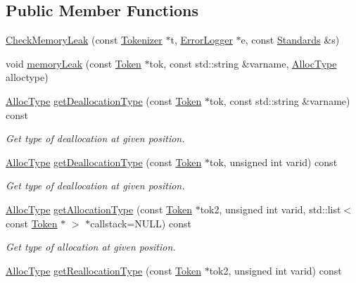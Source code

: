 \subsection*{Public Member Functions}
\begin{DoxyCompactItemize}
\item 
\hyperlink{class_check_memory_leak_a467ffa1c6f2af4bf3716676822a6de6b}{Check\-Memory\-Leak} (const \hyperlink{class_tokenizer}{Tokenizer} $\ast$t, \hyperlink{class_error_logger}{Error\-Logger} $\ast$e, const \hyperlink{struct_standards}{Standards} \&s)
\item 
void \hyperlink{class_check_memory_leak_ab4732d28de9c3966fc375eed62c8591c}{memory\-Leak} (const \hyperlink{class_token}{Token} $\ast$tok, const std\-::string \&varname, \hyperlink{class_check_memory_leak_ada9e7f7d0af2d8ba771a42d427f51ede}{Alloc\-Type} alloctype)
\item 
\hyperlink{class_check_memory_leak_ada9e7f7d0af2d8ba771a42d427f51ede}{Alloc\-Type} \hyperlink{class_check_memory_leak_a37a76dfae7bcd1dbfdabab8e4a317d02}{get\-Deallocation\-Type} (const \hyperlink{class_token}{Token} $\ast$tok, const std\-::string \&varname) const 
\begin{DoxyCompactList}\small\item\em Get type of deallocation at given position. \end{DoxyCompactList}\item 
\hyperlink{class_check_memory_leak_ada9e7f7d0af2d8ba771a42d427f51ede}{Alloc\-Type} \hyperlink{class_check_memory_leak_a4daae2120488a92dc755fc6301c49259}{get\-Deallocation\-Type} (const \hyperlink{class_token}{Token} $\ast$tok, unsigned int varid) const 
\begin{DoxyCompactList}\small\item\em Get type of deallocation at given position. \end{DoxyCompactList}\item 
\hyperlink{class_check_memory_leak_ada9e7f7d0af2d8ba771a42d427f51ede}{Alloc\-Type} \hyperlink{class_check_memory_leak_a2ae803e3009d4e5e1b2228aec2431a35}{get\-Allocation\-Type} (const \hyperlink{class_token}{Token} $\ast$tok2, unsigned int varid, std\-::list$<$ const \hyperlink{class_token}{Token} $\ast$ $>$ $\ast$callstack=N\-U\-L\-L) const 
\begin{DoxyCompactList}\small\item\em Get type of allocation at given position. \end{DoxyCompactList}\item 
\hyperlink{class_check_memory_leak_ada9e7f7d0af2d8ba771a42d427f51ede}{Alloc\-Type} \hyperlink{class_check_memory_leak_aa5d014eb05226fbea2e70583c9e67863}{get\-Reallocation\-Type} (const \hyperlink{class_token}{Token} $\ast$tok2, unsigned int varid) const 

\end{DoxyCompactItemize}
